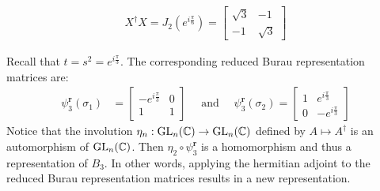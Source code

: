 \begin{example}
\begin{align*}
        X^\dagger X = J_{2}(e^{i\frac{\pi}{6}}) = \left[\begin{array}{cc} \sqrt{3} & -1\\ -1 & \sqrt{3} \end{array}\right]
    \end{align*}

    Recall that $t=s^2=e^{i\frac{\pi}{3}}$. The corresponding reduced Burau representation matrices are:
    \begin{align*}
        \psi_3^\textbf{r}(\sigma_1) &= \begin{bmatrix}
            -e^{i\frac{\pi}{3}} & 0 \\
            1 & 1
        \end{bmatrix} \quad \textrm{ and } \quad
        \psi_3^\textbf{r}(\sigma_2) = \begin{bmatrix}
            1 & e^{i\frac{\pi}{3}} \\
            0 & -e^{i\frac{\pi}{3}}
        \end{bmatrix}
    \end{align*}
    Notice that the involution $\eta_n:\textrm{GL}_n(\mathbb{C})\to\textrm{GL}_n(\mathbb{C})$ defined by $A \mapsto A^\dagger$ is an automorphism of $\textrm{GL}_n(\mathbb{C})$. Then $\eta_2\circ\psi_3^\textbf{r}$ is a homomorphism and thus a representation of $B_3$. In other words, applying the hermitian adjoint to the reduced Burau representation matrices results in a new representation.


\end{example}
